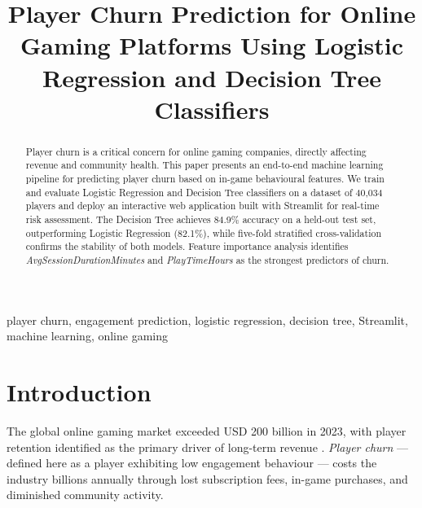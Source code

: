 \documentclass[conference]{IEEEtran}
\begin{document}
\title{Player Churn Prediction for Online Gaming Platforms Using
       Logistic Regression and Decision Tree Classifiers}

\author{
}

\maketitle

\begin{abstract}
Player churn is a critical concern for online gaming companies, directly affecting
revenue and community health.  This paper presents an end-to-end machine learning
pipeline for predicting player churn based on in-game behavioural features.  We
train and evaluate Logistic Regression and Decision Tree classifiers on a dataset
of 40{,}034 players and deploy an interactive web application built with Streamlit
for real-time risk assessment.  The Decision Tree achieves 84.9\% accuracy on a
held-out test set, outperforming Logistic Regression (82.1\%), while
five-fold stratified cross-validation confirms the stability of both models.
Feature importance analysis identifies \emph{AvgSessionDurationMinutes} and
\emph{PlayTimeHours} as the strongest predictors of churn.
\end{abstract}

\begin{IEEEkeywords}
player churn, engagement prediction, logistic regression, decision tree,
Streamlit, machine learning, online gaming
\end{IEEEkeywords}

\section{Introduction}

The global online gaming market exceeded USD 200 billion in 2023, with player
retention identified as the primary driver of long-term revenue \cite{newzoo2023}.
\emph{Player churn} --- defined here as a player exhibiting low engagement
behaviour --- costs the industry billions annually through lost subscription
fees, in-game purchases, and diminished community activity.
\end{document}
